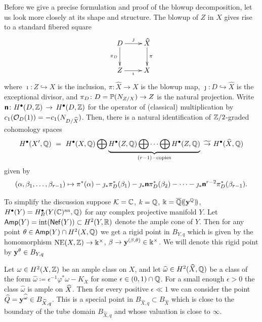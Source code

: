 \documentclass[twoside,leqno]{article}
\numberwithin{equation}{section}
\theoremstyle{plain}
\theoremstyle{definition}
\begin{document}
\medskip

Before we give a precise formulation and proof of the blowup decomposition, let us look more closely at its shape and structure. The blowup of $Z$ in $X$ gives rise to a standard fibered square
\begin{equation}\label{eq:blowupdiagram}
\xymatrix{
D \ar[r]^-{\jmath} \ar[d]_-{\pi_{D}} & \widehat{X} \ar[d]^-{\pi} \\
Z \ar[r]_-{\imath} & X
}
\end{equation}
where $\imath \colon Z \hookrightarrow X$ is the inclusion, $\pi \colon \widehat{X} \to X$ is the blowup map, $\jmath \colon D \hookrightarrow \widehat{X}$ is the exceptional divisor,
and $\pi_{D} \colon D = \mathbb P(N_{Z/X}) \to Z$ is the natural projection. Write \, $\boldsymbol{\mathsf{n}} \colon H^{\bullet}(D,\mathbb Z) \, \to \, H^{\bullet}(D,\mathbb Z)$  for the operator of (classical) multiplication by $c_{1}(\mathcal O_{D}(1)) = -c_{1}(N_{D/\widehat{X}})$. Then, there is a natural identification of $\mathbb Z/2$-graded cohomology spaces
\begin{equation} \label{eq:split.cohomology}
H^{\bullet}(X',\bbQ) \ = \ H^{\bullet}(X,\bbQ) \bigoplus \underbrace{H^{\bullet}(Z,\bbQ) \bigoplus \cdots \bigoplus H^{\bullet}(Z,\bbQ)}_{(r-1)-\text{copies}} \ \widetilde{\to} \ H^{\bullet}(\widehat{X},\bbQ)
\end{equation}
given by 
\[
(\alpha,\beta_1,\dots,\beta_{r-1})\mapsto \pi^*(\alpha)-\jmath_*\pi_{D}^{*}(\beta_1)-\jmath_* \boldsymbol{\mathsf{n}}\pi_{D}^{*}(\beta_2)-\dots - \jmath_* \boldsymbol{\mathsf{n}}^{r-2}\pi_{D}^{*}(\beta_{r-1}).
\]


\medskip

To simplify the discussion suppose $\mathcal K = \mathbb C$, $k = \mathbb Q$, $\Bbbk = \overline{\mathbb Q}(\!(\mathbf{y}^{\mathbb Q})\!)$, $H^{\bullet}(Y) = H^{\bullet}_{B}(Y(\mathbb C)^{\operatorname{an}},\mathbb Q)$  for any complex projective manifold $Y$. Let $\mathsf{Amp}(Y) = \operatorname{int}(\mathsf{Nef}(Y))  \subset H^2(Y,\mathbb R)$ denote the  ample cone of $Y$. Then for any point $\theta \in \mathsf{Amp}(Y)\cap H^2(X,\mathbb Q)$ we get a rigid point in $B_{Y,q}$ which is given by the homomorphism $\operatorname{NE}(X,\mathbb Z) \to \Bbbk^{\times}$, $\beta \to \mathbf{y}^{(\beta,\theta)} \in \Bbbk^{\times}$. We will denote this rigid point by 
$\mathbf{y}^{\theta} \in B_{Y,q}$

Let $\omega \in H^2(X,\mathbb Z)$ be an ample class on $X$, and let $\widehat{\omega} \in H^2(\widehat{X},\mathbb Q)$ be a class of the form $\widehat{\omega} \coloneqq \epsilon^{-1}\varphi^{*}\omega -  K_X$ for some $\epsilon \in (0,1)\cap  \mathbb Q$. For a small enough $\epsilon > 0$ the class $\widehat{\omega}$ is  ample on $\widehat{X}$. Then for every positive $\epsilon \ll 1$ we can consider the point $\widehat{Q} = \mathbf{y}^{\widehat{\omega}} \in B_{\widehat{X},q}$. This is a special point  
in $B_{\widehat{X},q} \subset B_{\widehat{X}}$ which is close to the boundary of the tube domain $B_{\widehat{X},q}$ and whose valuation is close to $\infty$.
\end{document}
